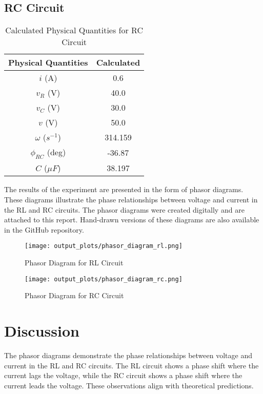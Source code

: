 \documentclass[journal]{IEEEtran}
\begin{document}
\subsection{RC Circuit}
\begin{table}[H]
    \centering
    \caption{Calculated Physical Quantities for RC Circuit}
    \label{tab:rc_results}
    \begin{tabular}{cc}
        \toprule
        \textbf{Physical Quantities} & \textbf{Calculated} \\
        \midrule
        \(i\) (A) & 0.6 \\
        \(v_R\) (V) & 40.0 \\
        \(v_C\) (V) & 30.0 \\
        \(v\) (V) & 50.0 \\
        \(\omega\) ($s^{-1}$) & 314.159 \\
        \(\phi_{RC}\) (deg) & -36.87 \\
        \(C\) ($\mu F$) & 38.197 \\
        \bottomrule
    \end{tabular}
\end{table}

The results of the experiment are presented in the form of phasor diagrams. These diagrams illustrate the phase relationships between voltage and current in the RL and RC circuits. The phasor diagrams were created digitally and are attached to this report. Hand-drawn versions of these diagrams are also available in the GitHub repository.

\begin{figure}[H]
    \centering
    \texttt{[image: output\_plots/phasor\_diagram\_rl.png]}
    \caption{Phasor Diagram for RL Circuit}
    \label{fig:phasor_rl}
\end{figure}

\begin{figure}[H]
    \centering
    \texttt{[image: output\_plots/phasor\_diagram\_rc.png]}
    \caption{Phasor Diagram for RC Circuit}
    \label{fig:phasor_rc}
\end{figure}

\section{Discussion}
The phasor diagrams demonstrate the phase relationships between voltage and current in the RL and RC circuits. The RL circuit shows a phase shift where the current lags the voltage, while the RC circuit shows a phase shift where the current leads the voltage. These observations align with theoretical predictions.
\end{document}

